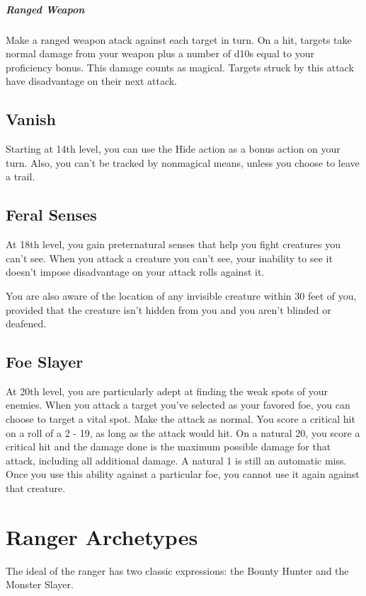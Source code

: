 \subparagraph*{Ranged Weapon} Make a ranged weapon atack against each target in turn. On a hit, targets take normal damage from your weapon plus a number of d10s equal to your proficiency bonus. This damage counts as magical. Targets struck by this attack have disadvantage on their next attack.

\subsection{Vanish}

Starting at 14th level, you can use the Hide action as a bonus action on your turn. Also, you can't be tracked by nonmagical means, unless you choose to leave a trail.

\subsection{Feral Senses}

At 18th level, you gain preternatural senses that help you fight creatures you can't see. When you attack a creature you can't see, your inability to see it doesn't impose disadvantage on your attack rolls against it.

You are also aware of the location of any invisible creature within 30 feet of you, provided that the creature isn't hidden from you and you aren't blinded or deafened.

\subsection{Foe Slayer}
At 20th level, you are particularly adept at finding the weak spots of your enemies. When you attack a target you've selected as your favored foe, you can choose to target a vital spot. Make the attack as normal. You score a critical hit on a roll of a 2 - 19, as long as the attack would hit. On a natural 20, you score a critical hit and the damage done is the maximum possible damage for that attack, including all additional damage. A natural 1 is still an automatic miss. Once you use this ability against a particular foe, you cannot use it again against that creature.

\section{Ranger Archetypes}

The ideal of the ranger has two classic expressions: the Bounty Hunter and the Monster Slayer.

